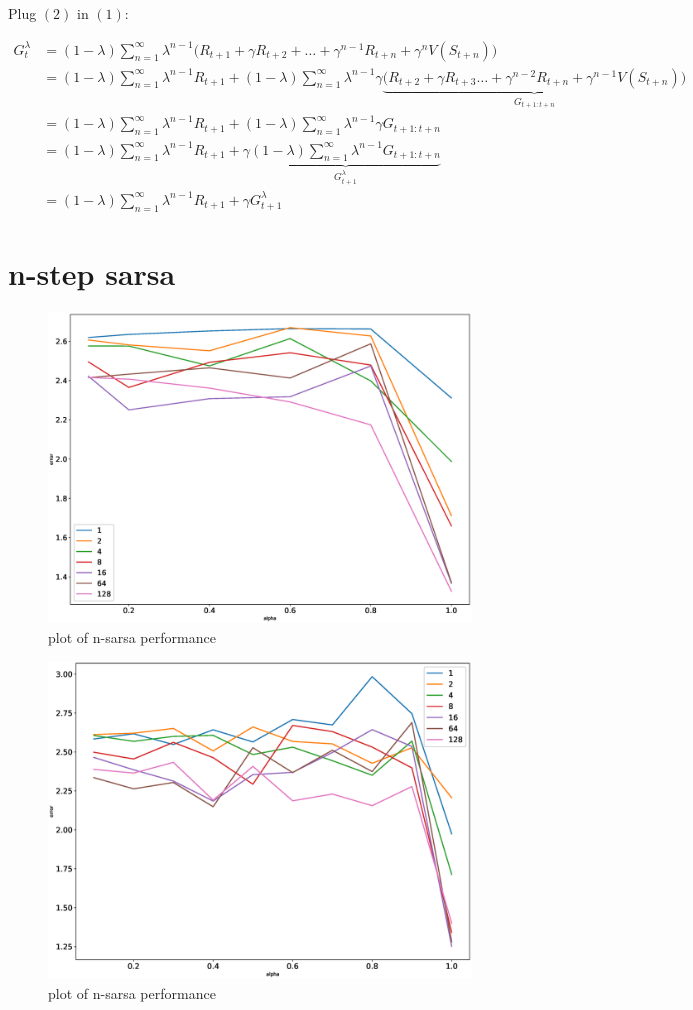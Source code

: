 \documentclass[11pt,a4paper]{article}
\begin{document}
Plug $(2)$ in $(1)$:

\begin{align*}
  G_{t}^{\lambda} &= (1-\lambda) \sum_{n=1}^{\infty} \lambda^{n-1} \bigl( 
  R_{t+1} + \gamma R_{t+2} + \dots + \gamma^{n-1} R_{t+n} + \gamma^{n} V(S_{t+n}) \bigr) \\
  &= (1-\lambda) \sum_{n=1}^{\infty} \lambda^{n-1}R_{t+1} + 
  (1-\lambda) \sum_{n=1}^{\infty} \lambda^{n-1}\gamma \underbrace{\bigl( R_{t+2} + 
  \gamma R_{t+3}\dots + \gamma^{n-2} R_{t+n} + \gamma^{n-1} V(S_{t+n}) \bigr)}_{ G_{t+1:t+n}} \\
  &= (1-\lambda) \sum_{n=1}^{\infty} \lambda^{n-1}R_{t+1} +
  (1-\lambda) \sum_{n=1}^{\infty} \lambda^{n-1}\gamma G_{t+1:t+n} \\
  &= (1-\lambda) \sum_{n=1}^{\infty} \lambda^{n-1}R_{t+1} +
  \gamma \underbrace{(1-\lambda) \sum_{n=1}^{\infty} \lambda^{n-1} G_{t+1:t+n}}_{G_{t+1}^{\lambda}} \\
  &= (1-\lambda) \sum_{n=1}^{\infty} \lambda^{n-1} R_{t+1} + \gamma G_{t+1}^{\lambda}
\end{align*}

\vspace{20pt}


\section{n-step sarsa}

\begin{figure}[h!]
  \includegraphics[width=.75\textwidth]{plots_v1.eps}
  \centering
  \caption{plot of n-sarsa performance}
  \label{fig1}
\end{figure}

\newpage


\begin{figure}[h!]
  \includegraphics[width=.75\textwidth]{plots_v2.eps}
  \centering
  \caption{plot of n-sarsa performance}
  \label{fig2}
\end{figure}
\end{document}
